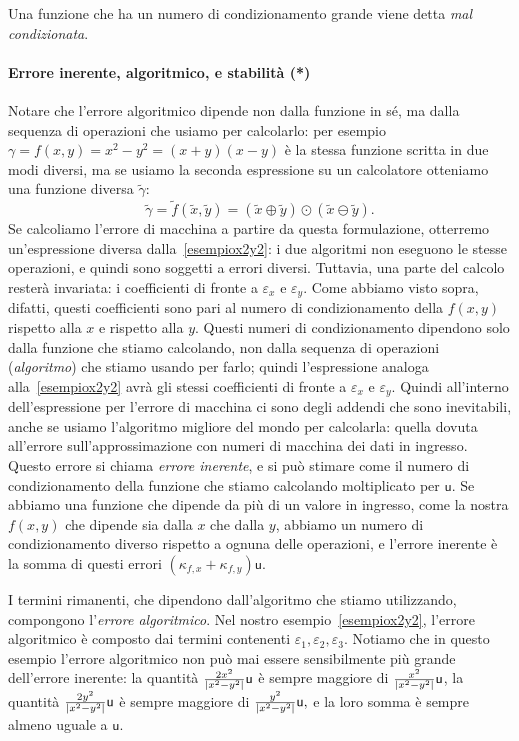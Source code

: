 \documentclass[a4paper]{report}
\DeclarePairedDelimiter{\abs}{\lvert}{\rvert}
\theoremstyle{definiton}
\theoremstyle{remark}
\begin{document}
Una funzione che ha un numero di condizionamento grande viene detta \emph{mal condizionata}.

\paragraph{Errore inerente, algoritmico, e stabilità (*)}

Notare che l'errore algoritmico dipende non dalla funzione in sé, ma dalla sequenza di operazioni che usiamo per calcolarlo: per esempio $\gamma = f(x,y) = x^2-y^2 = (x+y)(x-y)$ è la stessa funzione scritta in due modi diversi, ma se usiamo la seconda espressione su un calcolatore otteniamo una funzione diversa $\tilde{\gamma}$:
\[
    \tilde{\gamma} = \tilde{f}(\tilde{x},\tilde{y}) = (\tilde{x}\oplus\tilde{y})\odot(\tilde{x}\ominus\tilde{y}).
\]
Se calcoliamo l'errore di macchina a partire da questa formulazione, otterremo un'espressione diversa dalla~\eqref{esempiox2y2}: i due algoritmi non eseguono le stesse operazioni, e quindi sono soggetti a errori diversi. Tuttavia, una parte del calcolo resterà invariata: i coefficienti di fronte a $\varepsilon_x$ e $\varepsilon_y$. Come abbiamo visto sopra, difatti, questi coefficienti sono pari al numero di condizionamento della $f(x,y)$ rispetto alla $x$ e rispetto alla $y$. Questi numeri di condizionamento dipendono solo dalla funzione che stiamo calcolando, non dalla sequenza di operazioni (\emph{algoritmo}) che stiamo usando per farlo; quindi l'espressione analoga alla~\eqref{esempiox2y2} avrà gli stessi coefficienti di fronte a $\varepsilon_x$ e $\varepsilon_y$. Quindi all'interno dell'espressione per l'errore di macchina ci sono degli addendi che sono inevitabili, anche se usiamo l'algoritmo migliore del mondo per calcolarla: quella dovuta all'errore sull'approssimazione con numeri di macchina dei dati in ingresso. Questo errore si chiama \emph{errore inerente}, e si può stimare come il numero di condizionamento della funzione che stiamo calcolando moltiplicato per $\mathsf{u}$. Se abbiamo una funzione che dipende da più di un valore in ingresso, come la nostra $f(x,y)$ che dipende sia dalla $x$ che dalla $y$, abbiamo un numero di condizionamento diverso rispetto a ognuna delle operazioni, e l'errore inerente è la somma di questi errori $\left(\kappa_{f,x}+\kappa_{f,y}\right)\mathsf{u}$.

I termini rimanenti, che dipendono dall'algoritmo che stiamo utilizzando, compongono l'\emph{errore algoritmico}. Nel nostro esempio~\eqref{esempiox2y2}, l'errore algoritmico è composto dai termini contenenti $\varepsilon_1,\varepsilon_2,\varepsilon_3$. Notiamo che in questo esempio l'errore algoritmico non può mai essere sensibilmente più grande dell'errore inerente: la quantità
$
\frac{2x^2}{\abs{x^2-y^2}}\mathsf{u}
$
è sempre maggiore di 
$
\frac{x^2}{\abs{x^2-y^2}}\mathsf{u}
$, la quantità 
$
\frac{2y^2}{\abs{x^2-y^2}}\mathsf{u}
$
è sempre maggiore di 
$
\frac{y^2}{\abs{x^2-y^2}}\mathsf{u},
$
e la loro somma è sempre almeno uguale a $\mathsf{u}$.
\end{document}
